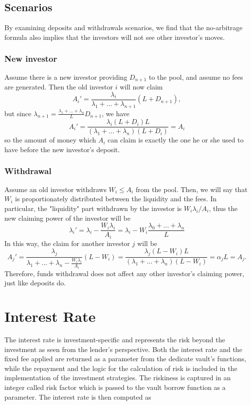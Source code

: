 \documentclass[a4paper,10 pt]{article}
\theoremstyle{definition}
\begin{document}
\subsection{Scenarios}
By examining deposits and withdrawals scenarios, we find that the no-arbitrage formula also implies that the investors will not see other investor's moves.
\subsubsection{New investor}
Assume there is a new investor providing $D_{n+1}$ to the pool, and assume no fees are generated. Then the old investor $i$ will now claim $$A_i' = \frac{\lambda_i}{\lambda_1+\ldots + \lambda_{n+1}}(L+D_{n+1}),$$ but since $\lambda_{n+1} = \frac{\lambda_1+\ldots+\lambda_n}{L}D_{n+1}$, we have $$A_i' = \frac{\lambda_i(L+D_i)L}{(\lambda_1+\ldots+\lambda_n)(L+D_i)} = A_i$$ so the amount of money which $A_i$ can claim is exactly the one he or she used to have before the new investor's deposit.

\subsubsection{Withdrawal}
Assume an old investor withdraws $W_i \le A_i$ from the pool. Then, we will say that $W_i$ is proportionately distributed between the liquidity and the fees. In particular, the "liquidity" part withdrawn by the investor is $W_i\lambda_i/A_i$, thus the new claiming power of the investor will be $$\lambda_i' = \lambda_i - \frac{W_i\lambda_i}{A_i}=\lambda_i-W_i\frac{\lambda_0+\ldots+\lambda_n}{L}$$ In this way, the claim for another investor $j$ will be $$A_j' = \frac{\lambda_j}{\lambda_1+\ldots+\lambda_n - \frac{W_i\lambda_i}{A_i}}(L-W_i) = \frac{\lambda_j(L-W_i)L}{(\lambda_1+\ldots+\lambda_n)(L-W_i)} = \alpha_jL = A_j. $$ Therefore, funds withdrawal does not affect any other investor's claiming power, just like deposits do.

\section{Interest Rate}

The interest rate is investment-specific and represents the risk beyond the investment as seen from the lender's perspective.
Both the interest rate and the fixed fee applied are returned as a parameter from the dedicate vault's functions, while the repayment and the logic for the calculation of risk is included in the implementation of the investment strategies. The riskiness is captured in an integer called risk factor which is passed to the vault borrow function as a parameter. The interest rate is then computed as
\end{document}
